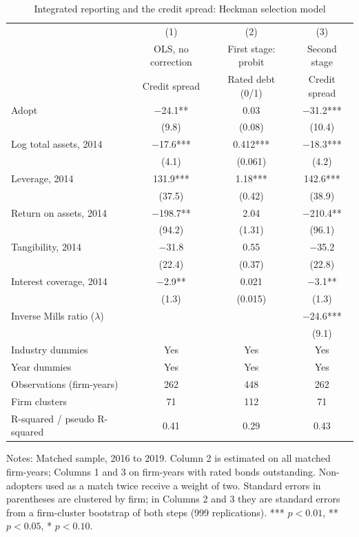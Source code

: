 \documentclass[11pt]{article}
\begin{document}
\begin{table}[!htbp]
\centering
\begin{threeparttable}
\caption{Integrated reporting and the credit spread: Heckman selection model}
\label{tab:main}
\small
\begin{tabular}{lccc}
\toprule
 & (1) & (2) & (3) \\
 & OLS, no correction & First stage: probit & Second stage \\
 & Credit spread & Rated debt (0/1) & Credit spread \\
\midrule
Adopt & $-$24.1** & 0.03 & $-$31.2*** \\
 & (9.8) & (0.08) & (10.4) \\
Log total assets, 2014 & $-$17.6*** & 0.412*** & $-$18.3*** \\
 & (4.1) & (0.061) & (4.2) \\
Leverage, 2014 & 131.9*** & 1.18*** & 142.6*** \\
 & (37.5) & (0.42) & (38.9) \\
Return on assets, 2014 & $-$198.7** & 2.04 & $-$210.4** \\
 & (94.2) & (1.31) & (96.1) \\
Tangibility, 2014 & $-$31.8 & 0.55 & $-$35.2 \\
 & (22.4) & (0.37) & (22.8) \\
Interest coverage, 2014 & $-$2.9** & 0.021 & $-$3.1** \\
 & (1.3) & (0.015) & (1.3) \\
Inverse Mills ratio ($\lambda$) & & & $-$24.6*** \\
 & & & (9.1) \\
Industry dummies & Yes & Yes & Yes \\
Year dummies & Yes & Yes & Yes \\
\midrule
Observations (firm-years) & 262 & 448 & 262 \\
Firm clusters & 71 & 112 & 71 \\
R-squared / pseudo R-squared & 0.41 & 0.29 & 0.43 \\
\bottomrule
\end{tabular}
\begin{tablenotes}\footnotesize
\item Notes: Matched sample, 2016 to 2019. Column 2 is estimated on all matched firm-years; Columns 1 and 3 on firm-years with rated bonds outstanding. Non-adopters used as a match twice receive a weight of two. Standard errors in parentheses are clustered by firm; in Columns 2 and 3 they are standard errors from a firm-cluster bootstrap of both steps (999 replications). *** $p<0.01$, ** $p<0.05$, * $p<0.10$.
\end{tablenotes}
\end{threeparttable}
\end{table}
\end{document}
